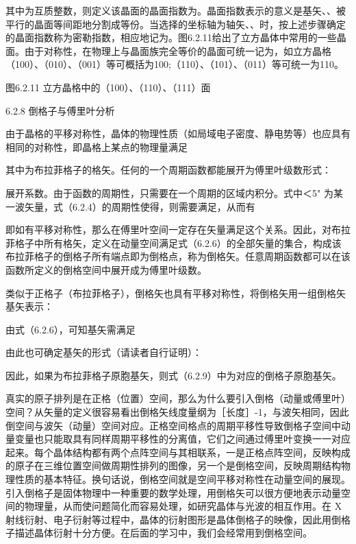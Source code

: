 其中为互质整数，则定义该晶面的晶面指数为。晶面指数表示的意义是基矢、、被平行的晶面等间距地分割成等份。当选择的坐标轴为轴矢、、时，按上述步骤确定的晶面指数称为密勒指数，相应地记为。图6.2.11给出了立方晶体中常用的一些晶面。由于对称性，在物理上与晶面族完全等价的晶面可统一记为，如立方晶格（100）、（010）、（001）等可概括为{100};（110）、（101）、（011）等可统一为{110}。



图6.2.11 立方晶格中的（100）、（110）、（111）面

6.2.8 倒格子与傅里叶分析

由于晶格的平移对称性，晶体的物理性质（如局域电子密度、静电势等）也应具有相同的对称性，即晶格上某点的物理量满足



其中为布拉菲格子的格矢。任何的一个周期函数都能展开为傅里叶级数形式：



展开系数。由于函数的周期性，只需要在一个周期的区域内积分。式中＜5" 为某一波矢量，式（6.2.4）的周期性使得，则需要满足，从而有



即如有平移对称性，那么在傅里叶空间一定存在矢量满足这个关系。因此，对布拉菲格子中所有格矢，定义在动量空间满足式（6.2.6）的全部矢量的集合，构成该布拉菲格子的倒格子所有端点即为倒格点，称为倒格矢。任意周期函数都可以在该函数所定义的倒格空间中展开成为傅里叶级数。

类似于正格子（布拉菲格子），倒格矢也具有平移对称性，将倒格矢用一组倒格矢基矢表示：



由式（6.2.6），可知基矢需满足



由此也可确定基矢的形式（请读者自行证明）：







因此，如果为布拉菲格子原胞基矢，则式（6.2.9）中为对应的倒格子原胞基矢。

真实的原子排列是在正格（位置）空间，那么为什么要引入倒格（动量或傅里叶）空间？从矢量的定义很容易看出倒格矢线度量纲为［长度］-1，与波矢相同，因此倒空间与波矢（动量）空间对应。正格空间格点的周期平移性导致倒格子空间中动量变量也只能取具有同样周期平移性的分离值，它们之间通过傅里叶变换一一对应起来。每个晶体结构都有两个点阵空间与其相联系，一是正格点阵空间，反映构成的原子在三维位置空间做周期性排列的图像，另一个是倒格空间，反映周期结构物理性质的基本特征。换句话说，倒格空间就是空间平移对称性在动量空间的展现。引入倒格子是固体物理中一种重要的数学处理，用倒格矢可以很方便地表示动量空间的物理量，从而使问题简化而容易处理，如研究晶体与光波的相互作用。在 X 射线衍射、电子衍射等过程中，晶体的衍射图形是晶体倒格子的映像，因此用倒格子描述晶体衍射十分方便。在后面的学习中，我们会经常用到倒格空间。

